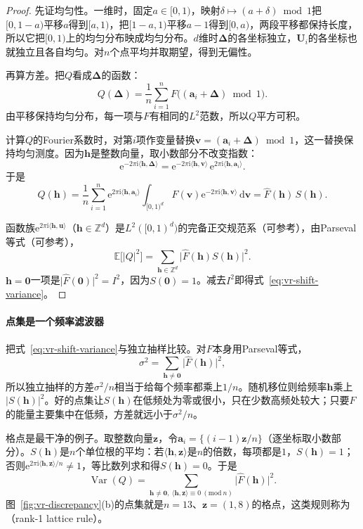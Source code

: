 \begin{proof}
先证均匀性。一维时，固定$a\in[0,1)$，映射$\delta\mapsto(a+\delta)\bmod1$把$[0,1-a)$平移$a$得到$[a,1)$，把$[1-a,1)$平移$a-1$得到$[0,a)$，两段平移都保持长度，所以它把$[0,1)$上的均匀分布映成均匀分布。$d$维时$\bm{\Delta}$的各坐标独立，$\bm{U}_i$的各坐标也就独立且各自均匀。对$n$个点平均并取期望，得到无偏性。

再算方差。把$Q$看成$\bm{\Delta}$的函数：
\[
 Q(\bm{\Delta})=\frac1n\sum_{i=1}^{n}F\bigl((\bm{a}_i+\bm{\Delta})\bmod1\bigr) .
\]由平移保持均匀分布，每一项与$F$有相同的$L^2$范数，所以$Q$平方可积。

计算$Q$的Fourier系数时，对第$i$项作变量替换$\bm{v}=(\bm{a}_i+\bm{\Delta})\bmod1$，这一替换保持均匀测度。因为$\bm{h}$是整数向量，取小数部分不改变指数：
\[
 \mathrm{e}^{-2\pi\mathrm{i}\langle\bm{h},\bm{\Delta}\rangle}=\mathrm{e}^{-2\pi\mathrm{i}\langle\bm{h},\bm{v}\rangle}\,\mathrm{e}^{2\pi\mathrm{i}\langle\bm{h},\bm{a}_i\rangle} .
\]
于是
\[
 \hat{Q}(\bm{h})=\frac1n\sum_{i=1}^{n}\mathrm{e}^{2\pi\mathrm{i}\langle\bm{h},\bm{a}_i\rangle}\int_{[0,1)^d}F(\bm{v})\mathrm{e}^{-2\pi\mathrm{i}\langle\bm{h},\bm{v}\rangle}\,\mathrm{d}\bm{v}=\hat{F}(\bm{h})\,S(\bm{h}) .
\]

函数族$\mathrm{e}^{2\pi\mathrm{i}\langle\bm{h},\bm{u}\rangle}$（$\bm{h}\in\mathbb{Z}^d$）是$L^2([0,1)^d)$的完备正交规范系（可参考），由Parseval等式（可参考），
\[
 \mathbb{E}\bigl[\lvert Q\rvert^2\bigr]=\sum_{\bm{h}\in\mathbb{Z}^d}\bigl\lvert\hat{F}(\bm{h})S(\bm{h})\bigr\rvert^2 .
\]
$\bm{h}=\bm{0}$一项是$\lvert\hat{F}(\bm{0})\rvert^2=I^2$，因为$S(\bm{0})=1$。减去$I^2$即得式~\eqref{eq:vr-shift-variance}。
\end{proof}

\paragraph{点集是一个频率滤波器}
把式~\eqref{eq:vr-shift-variance}与独立抽样比较。对$F$本身用Parseval等式，
\[
 \sigma^2=\sum_{\bm{h}\neq\bm{0}}\bigl\lvert\hat{F}(\bm{h})\bigr\rvert^2 ,
\]
所以独立抽样的方差$\sigma^2/n$相当于给每个频率都乘上$1/n$。随机移位则给频率$\bm{h}$乘上$\lvert S(\bm{h})\rvert^2$。好的点集让$S(\bm{h})$在低频处为零或很小，只在少数高频处较大；只要$F$的能量主要集中在低频，方差就远小于$\sigma^2/n$。

格点是最干净的例子。取整数向量$\bm{z}$，令$\bm{a}_i=\{(i-1)\bm{z}/n\}$（逐坐标取小数部分）。$S(\bm{h})$是$n$个单位根的平均：若$\langle\bm{h},\bm{z}\rangle$是$n$的倍数，每项都是$1$，$S(\bm{h})=1$；否则$\mathrm{e}^{2\pi\mathrm{i}\langle\bm{h},\bm{z}\rangle/n}\neq1$，等比数列求和得$S(\bm{h})=0$。于是
\begin{equation}
 \operatorname{Var}(Q)=\sum_{\bm{h}\neq\bm{0},\ \langle\bm{h},\bm{z}\rangle\equiv0\ (\mathrm{mod}\ n)}\bigl\lvert\hat{F}(\bm{h})\bigr\rvert^2 .
 \label{eq:vr-lattice-variance}
\end{equation}
图~\ref{fig:vr-discrepancy}(b)的点集就是$n=13$、$\bm{z}=(1,8)$的格点，这类规则称为（rank-1 lattice rule）。

